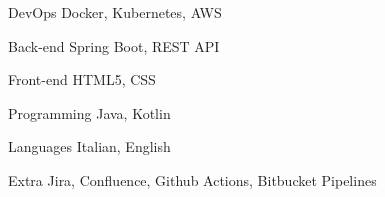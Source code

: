 

\begin{cvskills}

  \cvskill
    {DevOps} %
    {Docker, Kubernetes, AWS} %

  \cvskill
    {Back-end} %
    {Spring Boot, REST API} %

  \cvskill
    {Front-end} %
    {HTML5, CSS} %

  \cvskill
    {Programming} %
    {Java, Kotlin} %

  \cvskill
    {Languages} %
    {Italian, English} %

  \cvskill
    {Extra} %
    {Jira, Confluence, Github Actions, Bitbucket Pipelines} %

\end{cvskills}
